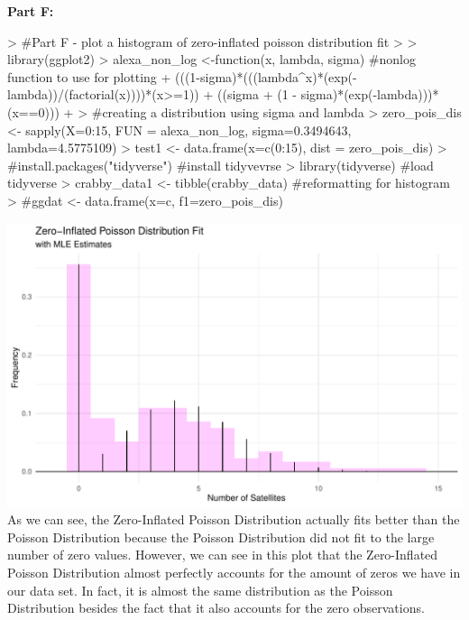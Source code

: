 \documentclass{article}
\begin{document}
\begin{enumerate}
\textbf{Part F:}
\begin{Schunk}
\begin{Sinput}
> #Part F - plot a histogram of zero-inflated poisson distribution fit
> 
> library(ggplot2)
> alexa_non_log <-function(x, lambda, sigma) { #nonlog function to use for plotting
+   (((1-sigma)*(((lambda^x)*(exp(-lambda))/(factorial(x))))*(x>=1)) + ((sigma + (1 - sigma)*(exp(-lambda)))*(x==0)))
+ }
> #creating a distribution using sigma and lambda
> zero_pois_dis <- sapply(X=0:15, FUN = alexa_non_log, sigma=0.3494643, lambda=4.5775109)
> test1 <- data.frame(x=c(0:15), dist = zero_pois_dis)
> #install.packages("tidyverse") #install tidyvevrse
> library(tidyverse) #load tidyverse
> crabby_data1 <- tibble(crabby_data) #reformatting for histogram
> #ggdat <- data.frame(x=c, f1=zero_pois_dis)
\end{Sinput}
\end{Schunk}

\includegraphics{HW1-028}
\newline
{}
\newline
As we can see, the Zero-Inflated Poisson Distribution actually fits better than the Poisson Distribution because the Poisson Distribution did not fit to the large number of zero values. However, we can see in this plot that the Zero-Inflated Poisson Distribution almost perfectly accounts for the amount of zeros we have in our data set. In fact, it is almost the same distribution as the Poisson Distribution besides the fact that it also accounts for the zero observations. 
	\end{enumerate}

\end{document}
